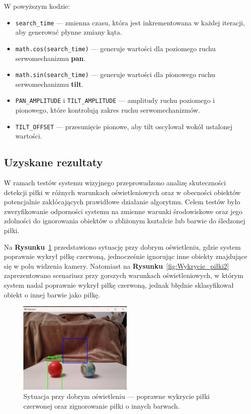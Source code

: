 \documentclass[a4paper,twoside,12pt]{book}
\begin{document}
W powyższym kodzie:
\begin{itemize}
    \item \texttt{search\_time} — zmienna czasu, która jest inkrementowana w każdej iteracji, aby generować płynne zmiany kąta.
    \item \texttt{math.cos(search\_time)} — generuje wartości dla poziomego ruchu serwomechanizmu \textbf{pan}.
    \item \texttt{math.sin(search\_time)} — generuje wartości dla pionowego ruchu serwomechanizmu \textbf{tilt}.
    \item \texttt{PAN\_AMPLITUDE} i \texttt{TILT\_AMPLITUDE} — amplitudy ruchu poziomego i pionowego, które kontrolują zakres ruchu serwomechanizmów.
    \item \texttt{TILT\_OFFSET} — przesunięcie pionowe, aby tilt oscylował wokół ustalonej wartości.
\end{itemize}

\newpage
\subsection{Uzyskane rezultaty}
W ramach testów systemu wizyjnego przeprowadzono analizę skuteczności detekcji piłki w różnych warunkach oświetleniowych oraz w obecności obiektów potencjalnie zakłócających prawidłowe działanie algorytmu. Celem testów było zweryfikowanie odporności systemu na zmienne warunki środowiskowe oraz jego zdolności do ignorowania obiektów o zbliżonym kształcie lub barwie do śledzonej piłki.

Na \textbf{Rysunku}~\ref{fig:Wykrycie_piłki1} przedstawiono sytuację przy dobrym oświetleniu, gdzie system poprawnie wykrył piłkę czerwoną, jednocześnie ignorując inne obiekty znajdujące się w polu widzenia kamery. Natomiast na \textbf{Rysunku}~\ref{fig:Wykrycie_piłki2} zaprezentowano scenariusz przy gorszych warunkach oświetleniowych, w którym system nadal poprawnie wykrył piłkę czerwoną, jednak błędnie sklasyfikował obiekt o innej barwie jako piłkę.

\begin{figure}[!hb]
    \centering
    \includegraphics[width=0.5\textwidth]{Images/Porownanie/Yolo7 robot/Zrzut ekranu 2025-01-02 194147.png}
    \caption{Sytuacja przy dobrym oświetleniu — poprawne wykrycie piłki czerwonej oraz zignorowanie piłki o innych barwach.}
    \label{fig:Wykrycie_piłki1}
\end{figure}
\end{document}
